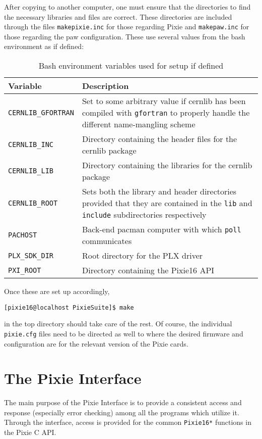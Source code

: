 \documentclass{article}
\begin{document}
After copying to another computer, one must ensure that the directories to
find the necessary libraries and files are correct. These directories are
included through the files \texttt{makepixie.inc} for those regarding Pixie
and \texttt{makepaw.inc} for those regarding the paw configuration. These use
several values from the bash environment as if defined:
\begin{table}[ht]
\label{fig:bashenv}
\caption{Bash environment variables used for setup if defined}
\begin{tabular}{lp{3in}}
\hline
Variable & Description \\
\hline
\texttt{CERNLIB\_GFORTRAN} & Set to some arbitrary value if cernlib has been
compiled with \texttt{gfortran} to properly handle the different name-mangling
scheme \\
\texttt{CERNLIB\_INC}      & Directory containing the header files for the cernlib
package \\
\texttt{CERNLIB\_LIB}      & Directory containing the libraries for the
cernlib package \\
\texttt{CERNLIB\_ROOT}     & Sets both the library and header directories provided
that they are contained in the \texttt{lib} and \texttt{include}
subdirectories respectively \\
\texttt{PACHOST}           & Back-end pacman computer with which \texttt{poll}
communicates \\
\texttt{PLX\_SDK\_DIR}     & Root directory for the PLX driver \\
\texttt{PXI\_ROOT}         & Directory containing the Pixie16 API \\
\end{tabular}
\end{table}
Once these are set up accordingly,
\begin{verbatim}
[pixie16@localhost PixieSuite]$ make
\end{verbatim}
in the top directory should take care of the rest. Of course, the individual \texttt{pixie.cfg} files need to be directed as well to where the desired firmware and configuration are for the relevant version of the Pixie cards.
\section{\label{sec:pi}The Pixie Interface}
The main purpose of the Pixie Interface is to provide a consistent access and response (especially error checking) among all the programs which utilize it. Through the interface, access is provided for the common \texttt{Pixie16*} functions in the Pixie C API. 
\end{document}
